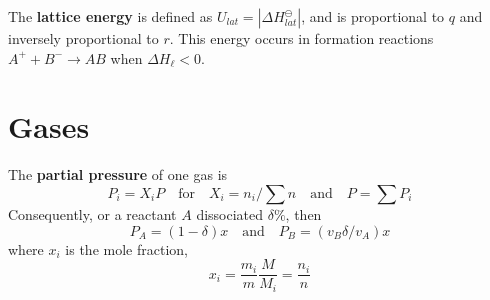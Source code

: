 \documentclass{tufte-book}
\renewcommand{\emph}[1]{\textbf{#1}}
\begin{document}
\bigskip
The \emph{lattice energy} is defined as $U_{lat} = |\Delta H^\ominus_{lat}|$, and is proportional to $q$ and inversely proportional to $r$. This energy occurs in formation reactions $A^+ + B^- \to AB$ when $\Delta H_\ell < 0$.

\section{Gases}

The \emph{partial pressure} of one gas is
\begin{equation}
  P_i = X_i P \quad\text{for}\quad X_i = n_i/\sum n \quad\text{and}\quad P = \sum P_i
\end{equation}
Consequently, or a reactant $A$ dissociated $\delta \%$, then \begin{equation}
  P_A = (1- \delta)x \quad\text{and}\quad P_B = (v_B \delta / v_A)x
\end{equation}
where $x_i$ is the mole fraction, \begin{equation}
  x_i = \frac{m_i}{m} \frac{M}{M_i} = \frac{n_i}{n}
\end{equation}
\end{document}
